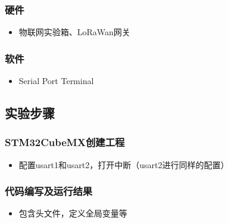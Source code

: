 \documentclass[a4paper,12pt,english]{sphinxmanual}
\begin{document}
{{\subsubsection{硬件}
\label{\detokenize{exp-lora/lorawan-stm32:id3}}\begin{itemize}
\item {} 
\sphinxAtStartPar
物联网实验箱、LoRaWan网关

\end{itemize}


\subsubsection{软件}
\label{\detokenize{exp-lora/lorawan-stm32:id4}}\begin{itemize}
\item {} 
\sphinxAtStartPar
Serial Port Terminal

\end{itemize}


\subsection{实验步骤}
\label{\detokenize{exp-lora/lorawan-stm32:id5}}

\subsubsection{STM32CubeMX创建工程}
\label{\detokenize{exp-lora/lorawan-stm32:stm32cubemx}}\begin{itemize}
\item {} 
\sphinxAtStartPar
配置usart1和usart2，打开中断（usart2进行同样的配置）

\end{itemize}

\sphinxAtStartPar
{}


\subsubsection{代码编写及运行结果}
\label{\detokenize{exp-lora/lorawan-stm32:id6}}\begin{itemize}
\item {} 
\sphinxAtStartPar
包含头文件，定义全局变量等

\end{itemize}

}}
\end{document}
